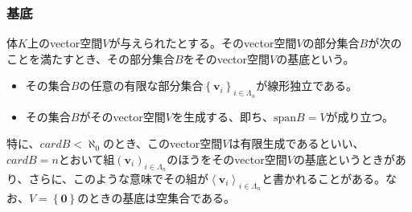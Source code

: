 \documentclass[dvipdfmx]{jsarticle}
\begin{document}
\subsubsection{基底}%
\begin{dfn}
体$K$上のvector空間$V$が与えられたとする。そのvector空間$V$の部分集合$B$が次のことを満たすとき、その部分集合$B$をそのvector空間$V$の基底という。
\begin{itemize}
\item
  その集合$B$の任意の有限な部分集合$\left\{ \mathbf{v}_{i} \right\}_{i \in \varLambda_{n}}$が線形独立である。
\item
  その集合$B$がそのvector空間$V$を生成する、即ち、${\mathrm{span}}B = V$が成り立つ。
\end{itemize}
特に、${card}B < \aleph_{0}$のとき、このvector空間$V$は有限生成であるといい、${card}B = n$とおいて組$\left( \mathbf{v}_{i} \right)_{i \in \varLambda_{n}}$のほうをそのvector空間$V$の基底というときがあり、さらに、このような意味でその組が$\left\langle \mathbf{v}_{i} \right\rangle_{i \in \varLambda_{n}}$と書かれることがある。なお、$V = \left\{ \mathbf{0} \right\}$のときの基底は空集合である。
\end{dfn}
\end{document}
